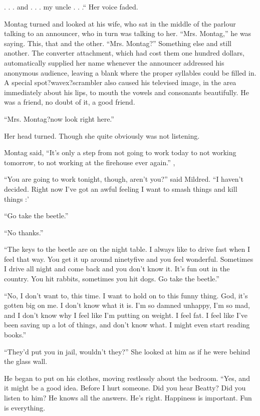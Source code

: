\documentclass[11pt,openany]{book}
\begin{document}
. . . and . . . my uncle . . .`` Her voice faded.

Montag turned and looked at his wife, who sat in the middle of the parlour talking to an announcer, who in turn was talking to her. ``Mrs. Montag,'' he was saying. This, that and the other. ``Mrs. Montag?'' Something else and still another. The converter attachment, which had cost them one hundred dollars, automatically supplied her name whenever the announcer addressed his anonymous audience, leaving a blank where the proper syllables could be filled in. A special spot?wavex?scrambler also caused his televised image, in the area immediately about his lips, to mouth the vowels and consonants beautifully. He was a friend, no doubt of it, a good friend.

``Mrs. Montag?now look right here.''

Her head turned. Though she quite obviously was not listening.

Montag said, ``It's only a step from not going to work today to not working tomorrow, to not working at the firehouse ever again.'' ,

``You are going to work tonight, though, aren't you?'' said Mildred. ``I haven't decided. Right now I've got an awful feeling I want to smash things and kill things :'

``Go take the beetle.''

``No thanks.''

``The keys to the beetle are on the night table. I always like to drive fast when I feel that way. You get it up around ninetyfive and you feel wonderful. Sometimes I drive all night and come back and you don't know it. It's fun out in the country. You hit rabbits, sometimes you hit dogs. Go take the beetle.''

``No, I don't want to, this time. I want to hold on to this funny thing. God, it's gotten big on me. I don't know what it is. I'm so damned unhappy, I'm so mad, and I don't know why I feel like I'm putting on weight. I feel fat. I feel like I've been saving up a lot of things, and don't know what. I might even start reading books.''

``They'd put you in jail, wouldn't they?'' She looked at him as if he were behind the glass wall.

He began to put on his clothes, moving restlessly about the bedroom. ``Yes, and it might be a good idea. Before I hurt someone. Did you hear Beatty? Did you listen to him? He knows all the answers. He's right. Happiness is important. Fun is everything.
\end{document}
